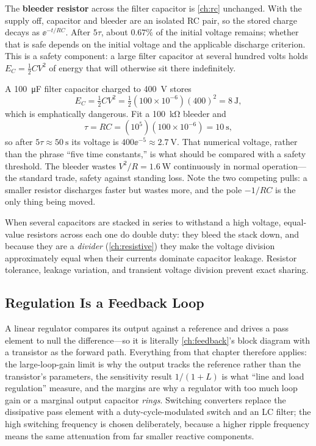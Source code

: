 The \textbf{bleeder resistor} across the filter capacitor is
\cref{ch:rc} unchanged. With the supply off, capacitor and bleeder are an isolated
RC pair, so the stored charge decays as \(\ee^{-t/RC}\). After \(5\tau\), about
\(0.67\%\) of the initial voltage remains; whether that is safe depends on the
initial voltage and the applicable discharge criterion. This is a safety component:
a large filter capacitor at several hundred
volts holds \(E_C=\tfrac12CV^2\) of energy that will otherwise sit there
indefinitely.

\begin{workedbox}
A \SI{100}{\micro\farad} filter capacitor charged to \SI{400}{\volt} stores
\[
E_C=\tfrac12CV^2=\tfrac12(100\times10^{-6})(400)^2=\SI{8}{\joule},
\]
which is emphatically dangerous. Fit a \SI{100}{\kilo\ohm} bleeder and
\[
\tau=RC=(10^5)(100\times10^{-6})=\SI{10}{\second},
\]
so after \(5\tau\approx\SI{50}{\second}\) its voltage is
\(400\ee^{-5}\approx\SI{2.7}{\volt}\). That numerical voltage, rather than the phrase
``five time constants,'' is what should be compared with a safety threshold.
The bleeder wastes \(V^2/R=\SI{1.6}{\watt}\) continuously in normal operation---the
standard trade, safety against standing loss. Note the two competing pulls: a
smaller resistor discharges faster but wastes more, and the pole \(-1/RC\) is the
only thing being moved.
\end{workedbox}

When several capacitors are stacked in series to withstand a high voltage,
equal-value resistors across each one do double duty: they bleed the stack down, and
because they are a \emph{divider} (\cref{ch:resistive}) they make the voltage division
approximately equal when their currents dominate capacitor leakage. Resistor tolerance,
leakage variation, and transient voltage division prevent exact sharing.

\subsection{Regulation Is a Feedback Loop}
A linear regulator compares its output against a reference and drives a pass element
to null the difference---so it is literally \cref{ch:feedback}'s block diagram with
a transistor as the forward path. Everything from that chapter therefore applies:
the large-loop-gain limit is why the output tracks the reference rather than the
transistor's parameters, the sensitivity result \(1/(1+L)\) is what ``line and load
regulation'' measure, and the margins are why a regulator with too much loop gain
or a marginal output capacitor \emph{rings}. Switching converters replace the
dissipative pass element with a duty-cycle-modulated switch and an LC filter; the
high switching frequency is chosen deliberately, because a higher ripple frequency
means the same attenuation from far smaller reactive components.


